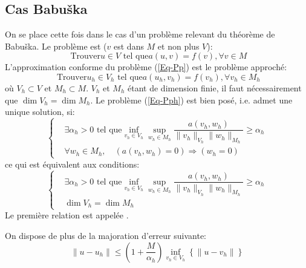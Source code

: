 \subsection{Cas Babuška}
On se place cette fois dans le cas d'un problème relevant du théorème de Babuška.
Le problème est ($v$ est dans $M$ et non plus $V$):
\begin{equation}\label{Eq-Pp}
\text{ Trouver} u\in V \text{ tel que} a(u,v) = f(v), \forall v\in M
\end{equation}
L'approximation conforme du problème (\ref{Eq-Pp}) est le problème approché:
\begin{equation}\label{Eq-Pph}
\text{ Trouver} u_h\in V_h \text{ tel que} a(u_h,v_h) = f(v_h), \forall v_h\in M_h
\end{equation}
où $V_h\subset V$ et $M_h\subset M$.
\medskip
{}
$V_h$ et $M_h$ étant de dimension finie, il faut nécessairement que $\dim V_h=\dim M_h$.
\medskip
Le problème (\ref{Eq-Pph}) est bien posé, i.e. admet une unique solution, si:
\begin{equation}\left\{
\begin{aligned}
&\displaystyle\exists\alpha_h>0 \text{ tel que} \inf_{v_h\in V_h}\sup_{w_h\in M_h}\dfrac{a(v_h,w_h)}{\|v_h\|_{V_h}\|w_h\|_{M_h}}\ge\alpha_h\\
&\forall w_h\in M_h,\quad \left(a(v_h,w_h)=0\right)\Rightarrow(w_h=0)
\end{aligned}
\right.\end{equation}
ce qui est équivalent aux conditions:
\begin{equation}\left\{
\begin{aligned}
&\displaystyle\exists\alpha_h>0 \text{ tel que} \inf_{v_h\in V_h}\sup_{w_h\in M_h}\dfrac{a(v_h,w_h)}{\|v_h\|_{V_h}\|w_h\|_{M_h}}\ge\alpha_h\\
&\dim V_h=\dim M_h
\end{aligned}
\right.\end{equation}
Le première relation est appelée .


\medskip
On dispose de plus de la majoration d'erreur suivante:
\begin{equation}
\|u-u_h\| \le \left(1+\dfrac{M}{\alpha_h}\right) \inf_{v_h\in V_h} \left\{\|u-v_h\|\right\}
\end{equation}
\medskip
